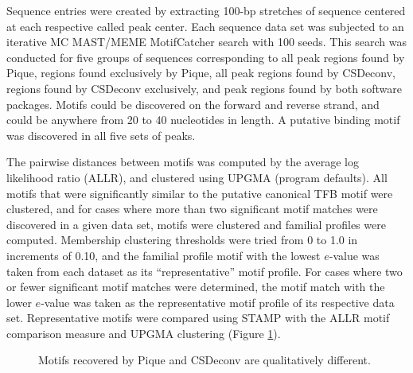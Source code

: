 \begin{refsection}
Sequence entries were created by extracting 100-bp stretches of
sequence centered at each respective called peak center.  Each
sequence data set was subjected to an iterative MC MAST/MEME
MotifCatcher search \cite{Seitzer_2012} with 100 seeds. This search was conducted for
five groups of sequences corresponding to all peak regions found by
Pique, regions found exclusively by Pique, all peak regions found by
CSDeconv, regions found by CSDeconv exclusively, and peak regions
found by both software packages. Motifs could be discovered on the
forward and reverse strand, and could be anywhere from 20 to 40
nucleotides in length. A putative binding motif was discovered in all
five sets of peaks.

The pairwise distances between motifs was computed by the average log
likelihood ratio (ALLR), and clustered using UPGMA (program
defaults). All motifs that were significantly similar to the putative
canonical TFB motif were clustered, and for cases where more than two
significant motif matches were discovered in a given data set, motifs
were clustered and familial profiles were computed. Membership
clustering thresholds were tried from 0 to 1.0 in increments of 0.10,
and the familial profile motif with the lowest $e$-value was taken
from each dataset as its ``representative'' motif profile.  For cases
where two or fewer significant motif matches were determined, the
motif match with the lower $e$-value was taken as the representative
motif profile of its respective data set. Representative motifs were
compared using STAMP \cite{STAMP} with the ALLR motif comparison
measure and UPGMA clustering (Figure \ref{P_motif-tree}).

\begin{figure}
  \begin{center}
    {}
  \end{center}
  \caption{Motifs recovered by Pique and CSDeconv are qualitatively
    different.}\label{P_motif-tree}
\end{figure}


\end{refsection}
